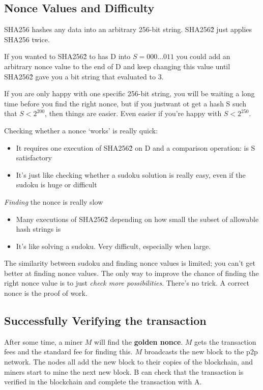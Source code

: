 \documentclass[11pt,a4paper,titlepage,dvipsnames,cmyk]{scrartcl}
\begin{document}
\subsection{Nonce Values and Difficulty}
SHA256 hashes any data into an arbitrary 256-bit string. SHA256\^2 just applies SHA256 twice.

If you wanted to SHA256\^2 to has D into $S=000\dots011$ you could add an arbitrary nonce value to the end of D and keep changing this value until SHA256\^2 gave you a bit string that evaluated to 3.

If you are only happy with one specific 256-bit string, you will be waiting a long time before you find the right nonce, but if you justwant ot get a hash S such that $S < 2^{200}$, then things are easier. Even easier if you're happy with $S<2^{250}$.

Checking whether a nonce `works' is really quick:
\begin{itemize}
    \item It requires one execution of SHA256\^2 on D and a comparison operation: is S satisfactory
    \item It's just like checking whether a sudoku solution is really easy, even if the sudoku is huge or difficult
\end{itemize}

\textit{Finding} the nonce is really slow
\begin{itemize}
    \item Many executions of SHA256\^2 depending on how small the subset of allowable hash strings is
    \item It's like solving a sudoku. Very difficult, especially when large.
\end{itemize}

The similarity between sudoku and finding nonce values is limited; you can't get better at finding nonce values. The only way to improve the chance of finding the right nonce value is to just \textit{check more possibilities}. There's no trick. A correct nonce is the proof of work.

\subsection{Successfully Verifying the transaction}
After some time, a miner $M$ will find the \textbf{golden nonce}. $M$ gets the transaction fees and the standard fee for finding this. $M$ broadcasts the new block to the p2p network. The nodes all add the new block to their copies of the blockchain, and miners start to mine the next new block. B can check that the transaction is verified in the blockchain and complete the transaction with A.
\end{document}
